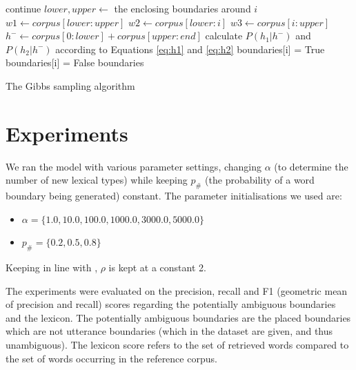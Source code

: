 \documentclass[11pt]{article}
\begin{document}
\begin{algorithm}
    \begin{algorithmic}
        \For{$i \in$ $[0, |corpus|)$}
            \State continue 
        \EndIf
        \State $lower, upper \gets $ the enclosing boundaries around $i$
        \State $w1 \gets corpus[lower:upper]$ 
        \State $w2 \gets corpus[lower:i]$
        \State $w3 \gets corpus[i:upper]$
        \State $h^{-} \gets corpus[0:lower] + corpus[upper:end]$ 
        \State
        \State calculate $P(h_1 | h^-)$ and $P(h_2 | h^-)$ according to
               Equations \ref{eq:h1} and \ref{eq:h2}
        \State
          \State boundaries[i] = True
        \Else
          \State boundaries[i] = False
        \EndIf
        \EndFor
        \State \Return boundaries
    \EndFunction
    \end{algorithmic}
    \caption{The Gibbs sampling algorithm}
    \label{algo:gibbs}
\end{algorithm}

\FloatBarrier
\section{Experiments}
We ran the model with various parameter settings, changing $\alpha$ (to determine the number of new lexical types) while keeping $p_\#$ (the probability of a word boundary being generated) constant. The parameter initialisations we used are:
\begin{itemize}
\item $\alpha = \{1.0, 10.0, 100.0, 1000.0, 3000.0, 5000.0\}$
\item $p_\# = \{0.2, 0.5, 0.8\}$
\end{itemize}
Keeping in line with \cite{goldwater2009}, $\rho$ is kept at a constant 2.

The experiments were evaluated on the precision, recall and F1 (geometric mean
of precision and recall) scores regarding the potentially ambiguous boundaries
and the lexicon. The potentially ambiguous boundaries are the placed boundaries
which are not utterance boundaries (which in the dataset are given, and thus
unambiguous). The lexicon score refers to the set of retrieved words compared to
the set of words occurring in the reference corpus.
\end{document}
